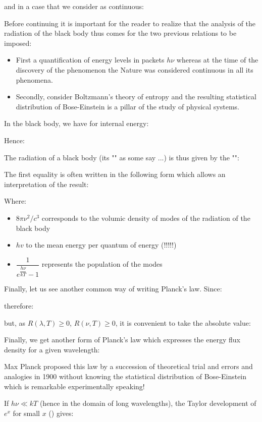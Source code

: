 	and in a case that we consider as continuous:
	
	Before continuing it is important for the reader to realize that the analysis of the radiation of the black body thus comes for the two previous relations to be imposed:
	\begin{itemize}
		\item First a quantification of energy levels in packets $h\nu$ whereas at the time of the discovery of the phenomenon the Nature was considered continuous in all its phenomena.

		\item Secondly, consider Boltzmann's theory of entropy and the resulting statistical distribution of Bose-Einstein is a pillar of the study of physical systems.
	\end{itemize}
	In the black body, we have for internal energy:
	
	Hence:
	
	The radiation of a black body (its "" as some say ...) is thus given by the "":
	
	The first equality is often written in the following form which allows an interpretation of the result:
	
	Where:
	\begin{itemize}
		\item  $8\pi\nu^2/c^3$ corresponds to the volumic density of modes of the radiation of the black body

		\item $hv$ to the mean energy per quantum of energy (!!!!!)

		\item $\dfrac{1}{e^{\dfrac{h\nu}{kT}}-1}$ represents the population of the modes
	\end{itemize}

	Finally, let us see another common way of writing Planck's law. Since:
	
	therefore:
	
	but, as $R(\lambda,T)\geq 0$, $R(\nu,T)\geq 0$, it is convenient to take the absolute value:
	
	Finally, we get another form of Planck's law which expresses the energy flux density for a given wavelength:
	
	\begin{tcolorbox}[title=Remark,colframe=black,arc=10pt]
	Max Planck proposed this law by a succession of theoretical trial and errors and analogies in 1900 without knowing the statistical distribution of Bose-Einstein which is remarkable experimentally speaking!
	\end{tcolorbox}
	If $h\nu\ll kT$ (hence in the domain of long wavelengths), the Taylor development of $e^x$ for small $x$ () gives:
	
